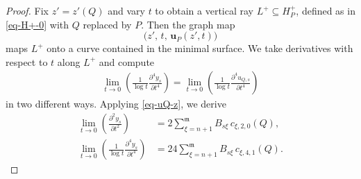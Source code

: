 \documentclass[10pt,a4paper]{amsart}
\newcommand{\fm}{\mathfrak{m}}
\begin{document}
\begin{proof}
Fix $z' = z'(Q)$ and vary $t$ to obtain a vertical ray $L^+ \subseteq H_P^+$, defined as in \eqref{eq-H+-0} with $Q$ replaced by $P$. Then the graph map
\begin{equation}
    \bigl(z',\, t,\, \mathbf{u}_P(z', t)\bigr)
\end{equation}
maps $L^+$ onto a curve contained in the minimal surface. We take derivatives with respect to $t$ along $L^+$ and compute
\begin{align}
    \lim_{t\rightarrow 0}\left(\frac{1}{\log t} \frac{\partial^4 y_s}{\partial t^4} \right)
    = \lim_{t\rightarrow 0}\left(\frac{1}{\log t} \frac{\partial^4 u_{Q,s}}{\partial t^4} \right)
\end{align}
in two different ways. Applying \eqref{eq-uQ-z}, we derive
\begin{align}
    \lim_{t\rightarrow 0}\left(\frac{\partial^2 y_s}{\partial t^2} \right)
    &= 2 \sum_{\xi=n+1}^\fm B_{s\xi} \, c_{\xi,2,0}(Q), \label{eq-c2-trans}\\[4pt]
    \lim_{t\rightarrow 0}\left(\frac{1}{\log t} \frac{\partial^4 y_s}{\partial t^4} \right)
    &= 24 \sum_{\xi=n+1}^\fm B_{s\xi} \, c_{\xi,4,1}(Q). \label{eq-c41-trans}
\end{align}


\end{proof}
\end{document}
